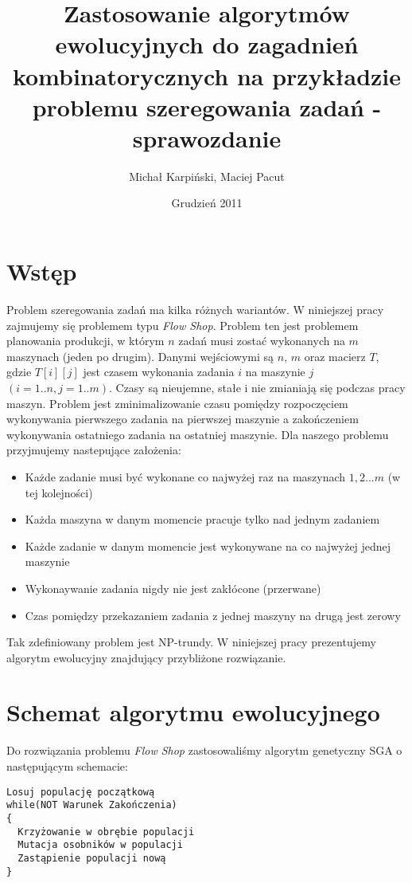 \documentclass[12pt]{article}
\title{Zastosowanie algorytmów ewolucyjnych do zagadnień
  kombinatorycznych na przykładzie problemu szeregowania zadań - sprawozdanie}
\author{Michał Karpiński, Maciej Pacut}
\date{Grudzień 2011}
\begin{document}
  \maketitle
\section{Wstęp}
Problem szeregowania zadań ma kilka różnych wariantów. W niniejszej pracy zajmujemy się problemem typu {\em Flow Shop}.
Problem ten jest problemem planowania produkcji, w którym $n$ zadań musi zostać wykonanych na $m$ maszynach (jeden po drugim).
Danymi wejściowymi są $n$, $m$ oraz macierz $T$, gdzie $T[i][j]$ jest czasem wykonania zadania $i$ na maszynie $j$ $(i = 1..n, j = 1..m )$.
Czasy są nieujemne, stałe i nie zmianiają się podczas pracy maszyn. Problem jest zminimalizowanie czasu 
pomiędzy rozpoczęciem wykonywania pierwszego zadania na pierwszej maszynie a zakończeniem wykonywania ostatniego zadania na ostatniej maszynie.
Dla naszego problemu przyjmujemy nastepujące założenia:

\begin{itemize}
  \item Każde zadanie musi być wykonane co najwyżej raz na maszynach $1, 2 ... m$ (w tej kolejności)
  \item Każda maszyna w danym momencie pracuje tylko nad jednym zadaniem
  \item Każde zadanie w danym momencie jest wykonywane na co najwyżej jednej maszynie
  \item Wykonaywanie zadania nigdy nie jest zakłócone (przerwane)
  \item Czas pomiędzy przekazaniem zadania z jednej maszyny na drugą jest zerowy
\end{itemize}

Tak zdefiniowany problem jest NP-trundy. W niniejszej pracy prezentujemy algorytm ewolucyjny znajdujący przybliżone rozwiązanie.

\section{Schemat algorytmu ewolucyjnego}

Do rozwiązania problemu {\em Flow Shop} zastosowaliśmy algorytm
genetyczny SGA o następującym schemacie:

\begin{verbatim}
Losuj populację początkową
while(NOT Warunek Zakończenia)
{
  Krzyżowanie w obrębie populacji
  Mutacja osobników w populacji
  Zastąpienie populacji nową
}
\end{verbatim}
\end{document}
